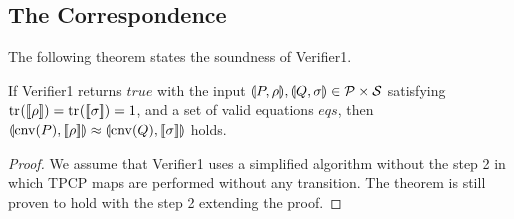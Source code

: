 \subsection{The Correspondence}
The following theorem states the soundness of Verifier1.
\begin{thm}
\label{symqccs:correspondence}
 If Verifier1 returns $\mathit{true}$ with the input $\llparenthesis P, \rho \rrparenthesis,
 \llparenthesis Q, \sigma \rrparenthesis \in \mathcal{P} \times \mathcal{S}$ satisfying
 ${\rm tr}_{}([\![\rho]\!])={\rm tr}_{}([\![\sigma]\!])=1$,
 and a set of valid equations $\mathit{eqs}$, then
 $\llparenthesis \mathrm{cnv}(P), [\![\rho]\!] \rrparenthesis
 \approx \llparenthesis \mathrm{cnv}(Q), [\![\sigma]\!] \rrparenthesis$ holds.
\end{thm}
\begin{proof}
We assume 
that Verifier1 uses a simplified algorithm without the step 2 in
which TPCP maps are performed without any transition.
The theorem is still proven to hold with the step 2 extending the
proof.


\end{proof}
